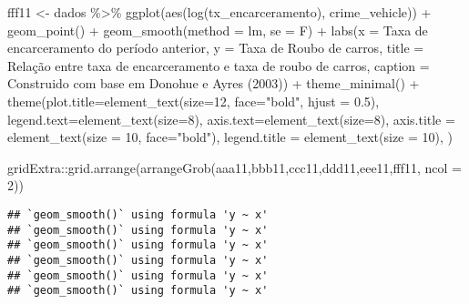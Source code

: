 \documentclass[
]{article}
\newenvironment{Shaded}{\begin{snugshade}}{\end{snugshade}}
\newcommand{\AttributeTok}[1]{\textcolor[rgb]{0.77,0.63,0.00}{#1}}
\newcommand{\DecValTok}[1]{\textcolor[rgb]{0.00,0.00,0.81}{#1}}
\newcommand{\FloatTok}[1]{\textcolor[rgb]{0.00,0.00,0.81}{#1}}
\newcommand{\FunctionTok}[1]{\textcolor[rgb]{0.00,0.00,0.00}{#1}}
\newcommand{\NormalTok}[1]{#1}
\newcommand{\OtherTok}[1]{\textcolor[rgb]{0.56,0.35,0.01}{#1}}
\newcommand{\SpecialCharTok}[1]{\textcolor[rgb]{0.00,0.00,0.00}{#1}}
\newcommand{\StringTok}[1]{\textcolor[rgb]{0.31,0.60,0.02}{#1}}
\begin{document}
\begin{Shaded}
\begin{Highlighting}[]
\NormalTok{fff11 }\OtherTok{\textless{}{-}}\NormalTok{ dados }\SpecialCharTok{\%\textgreater{}\%} 
  \FunctionTok{ggplot}\NormalTok{(}\FunctionTok{aes}\NormalTok{(}\FunctionTok{log}\NormalTok{(tx\_encarceramento), crime\_vehicle)) }\SpecialCharTok{+}
  \FunctionTok{geom\_point}\NormalTok{() }\SpecialCharTok{+} 
  \FunctionTok{geom\_smooth}\NormalTok{(}\AttributeTok{method =} \StringTok{\textquotesingle{}lm\textquotesingle{}}\NormalTok{, }\AttributeTok{se =}\NormalTok{ F) }\SpecialCharTok{+}
  \FunctionTok{labs}\NormalTok{(}\AttributeTok{x =} \StringTok{\textquotesingle{}Taxa de encarceramento do período anterior\textquotesingle{}}\NormalTok{,}
       \AttributeTok{y =} \StringTok{\textquotesingle{}Taxa de Roubo de carros\textquotesingle{}}\NormalTok{,}
       \AttributeTok{title =} \StringTok{\textquotesingle{}Relação entre taxa de encarceramento e taxa de roubo de carros\textquotesingle{}}\NormalTok{,}
       \AttributeTok{caption =} \StringTok{\textquotesingle{}Construido com base em Donohue e Ayres (2003)\textquotesingle{}}\NormalTok{) }\SpecialCharTok{+} 
  \FunctionTok{theme\_minimal}\NormalTok{() }\SpecialCharTok{+}
  \FunctionTok{theme}\NormalTok{(}\AttributeTok{plot.title=}\FunctionTok{element\_text}\NormalTok{(}\AttributeTok{size=}\DecValTok{12}\NormalTok{, }\AttributeTok{face=}\StringTok{"bold"}\NormalTok{, }\AttributeTok{hjust =} \FloatTok{0.5}\NormalTok{),}
        \AttributeTok{legend.text=}\FunctionTok{element\_text}\NormalTok{(}\AttributeTok{size=}\DecValTok{8}\NormalTok{),}
        \AttributeTok{axis.text=}\FunctionTok{element\_text}\NormalTok{(}\AttributeTok{size=}\DecValTok{8}\NormalTok{),}
        \AttributeTok{axis.title =} \FunctionTok{element\_text}\NormalTok{(}\AttributeTok{size =} \DecValTok{10}\NormalTok{, }\AttributeTok{face=}\StringTok{"bold"}\NormalTok{),}
        \AttributeTok{legend.title =} \FunctionTok{element\_text}\NormalTok{(}\AttributeTok{size =} \DecValTok{10}\NormalTok{),}
\NormalTok{        )}

\NormalTok{gridExtra}\SpecialCharTok{::}\FunctionTok{grid.arrange}\NormalTok{(}\FunctionTok{arrangeGrob}\NormalTok{(aaa11,bbb11,ccc11,ddd11,eee11,fff11, }\AttributeTok{ncol =} \DecValTok{2}\NormalTok{))}
\end{Highlighting}
\end{Shaded}

\begin{verbatim}
## `geom_smooth()` using formula 'y ~ x'
## `geom_smooth()` using formula 'y ~ x'
## `geom_smooth()` using formula 'y ~ x'
## `geom_smooth()` using formula 'y ~ x'
## `geom_smooth()` using formula 'y ~ x'
## `geom_smooth()` using formula 'y ~ x'
\end{verbatim}
\end{document}
